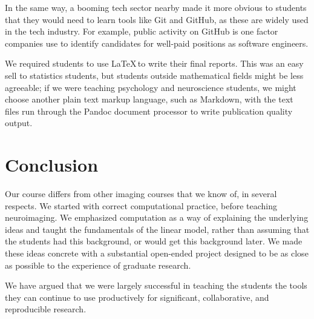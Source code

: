 In the same way, a booming tech sector nearby made it more obvious to students
that they would need to learn tools like Git and GitHub, as these are widely
used in the tech industry.  For example, public activity on GitHub is one
factor companies use to identify candidates for well-paid positions as
software engineers.

We required students to use \LaTeX\,to write their final reports.  This was an
easy sell to statistics students, but students outside mathematical fields
might be less agreeable; if we were teaching psychology and neuroscience
students, we might choose another plain text markup language, such as
Markdown, with the text files run through the Pandoc document processor to
write publication quality output.


\section*{Conclusion}

Our course differs from other imaging courses that we know of, in several
respects.  We started with correct computational practice, before teaching
neuroimaging.  We emphasized computation as a way of explaining the underlying
ideas and taught the fundamentals of the linear model, rather than assuming
that the students had this background, or would get this background later.
We made these ideas concrete with a substantial open-ended project designed to
be as close as possible to the experience of graduate research.

We have argued that we were largely successful in teaching the students the
tools they can continue to use productively for significant, collaborative, and
reproducible research.

